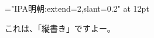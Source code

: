 
\begin{enumerate}
\font\Mincho="IPA明朝:extend=2,slant=0.2" at 12pt

\Mincho これは、「縦書き」ですよー。 
\end{enumerate}
